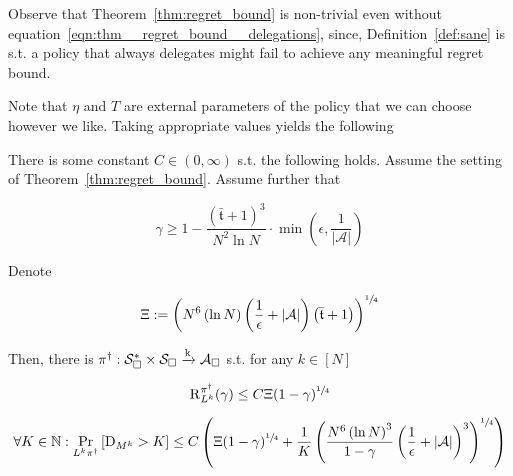 \documentclass[anon,12pt]{colt2018} %
\newcommand{\Comment}[1]{}
\newcommand{\AP}[1]{\left(#1\right)}
\newcommand{\AB}[1]{\left[#1\right]}
\newcommand{\Pa}[2]{\underset{#1}{\operatorname{Pr}}\AB{#2}}
\newcommand{\Nats}{\mathbb{N}}
\newcommand{\Abs}[1]{\left\vert #1 \right\vert}
\newcommand{\K}{\xrightarrow{\textnormal{k}}}
\newcommand{\A}{\mathcal{A}}
\newcommand{\St}{\mathcal{S}}
\newcommand{\Rg}{\operatorname{R}}
\newcommand{\MP}[2]{#1#2}
\newcommand{\Tn}{\mathfrak{t}}
\newcommand{\ND}{\operatorname{D}}
\newcommand{\RC}{\Xi}
\begin{document}
Observe that Theorem~\ref{thm:regret_bound} is non-trivial even without equation~\ref{eqn:thm__regret_bound__delegations}, since, Definition~\ref{def:sane} is s.t. a policy that always delegates might fail to achieve any meaningful regret bound.

Note that $\eta$ and $T$ are external parameters of the policy that we can choose however we like. Taking appropriate values yields the following

\begin{samepage}
\begin{corollary}
\label{crl:balanced_regret_bound}

There is some constant $C \in (0,\infty)$ s.t. the following holds. Assume the setting of Theorem~\ref{thm:regret_bound}. Assume further that 

\begin{equation}
\gamma \geq 1 - \frac{\AP{\bar{\Tn}+1}^3}{N^2 \ln{N}}\cdot\min\AP{\epsilon,\frac{1}{\Abs{\A}}}
\end{equation}

Denote

\begin{equation}
\label{eqn:crl__balanced_regret_bound__RC}
\RC:=\AP{N^6 \AP{\ln N} \AP{\frac{1}{\epsilon}+\Abs{\A}}\AP{\bar{\Tn}+1}}^{\sfrac{1}{4}}
\end{equation}

Then, there is $\pi^\dagger: \St_\square^* \times \St_\square \K \A_\square$ s.t. for any $k\in[N]$

\begin{equation}
\label{eqn:crl__balanced_regret_bound__regret}
\Rg_{L^k}^{\pi^\dagger}(\gamma) \leq C\RC(1-\gamma)^{\sfrac{1}{4}}%
\end{equation}

\begin{equation}
\label{eqn:crl__balanced_regret_bound__delegations}
\forall K \in \Nats: \Pa{\MP{L^k}{\pi^\dagger}}{\ND_{M^k} > K} \leq C\AP{\Xi(1-\gamma)^{\sfrac{1}{4}}+\frac{1}{K}\AP{\frac{N^6\AP{\ln{N}}^3}{1-\gamma}\AP{\frac{1}{\epsilon}+\Abs{\A}}^3}^{\sfrac{1}{4}}}
\end{equation}

\end{corollary}
\end{samepage}

\Comment{The meaning of the factor $\bar{\Tn}+1$ in equation~(\ref{eqn:crl__balanced_regret_bound__RC}) might seem somewhat unclear, however, we can upper bound this factor in terms of parameters related to \emph{mixing time}: see Appendix~\ref{sec:mixing_time}.}
\end{document}
